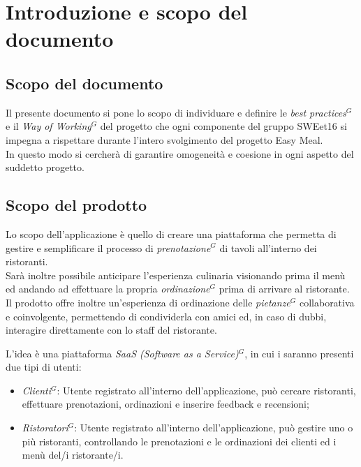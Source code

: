 \section{Introduzione e scopo del documento}

    \subsection{Scopo del documento}

    Il presente documento si pone lo scopo di individuare e definire le \emph{best practices}$^{G}$ e il \emph{Way of Working}$^{G}$ del progetto che ogni componente del gruppo SWEet16
    si impegna a rispettare durante l’intero svolgimento del progetto Easy Meal. \\
    In questo modo si cercherà di garantire omogeneità e coesione in ogni aspetto del suddetto progetto.

    \subsection{Scopo del prodotto}

    Lo scopo dell’applicazione è quello di creare una piattaforma che permetta di gestire e semplificare il processo di \emph{prenotazione}$^{G}$ di tavoli all’interno dei ristoranti. \\
    Sarà inoltre possibile anticipare l’esperienza culinaria visionando prima il menù ed andando ad effettuare la propria \emph{ordinazione}$^{G}$ prima di arrivare al ristorante. \\
    Il prodotto offre inoltre un’esperienza di ordinazione delle \emph{pietanze}$^{G}$ collaborativa e coinvolgente, permettendo di condividerla con amici ed, in caso di dubbi, interagire direttamente con lo staff del ristorante.

    L’idea è una piattaforma \emph{SaaS (Software as a Service)}$^{G}$, in cui i saranno presenti due tipi di utenti:
    \begin{itemize}
      \item \emph{Clienti}$^{G}$: Utente registrato all’interno dell’applicazione, può cercare ristoranti, effettuare prenotazioni, ordinazioni e inserire feedback e recensioni;
      \item \emph{Ristoratori}$^{G}$: Utente registrato all’interno dell’applicazione, può gestire uno o più ristoranti, controllando le prenotazioni e le ordinazioni dei clienti ed i menù del/i ristorante/i.
    \end{itemize}



